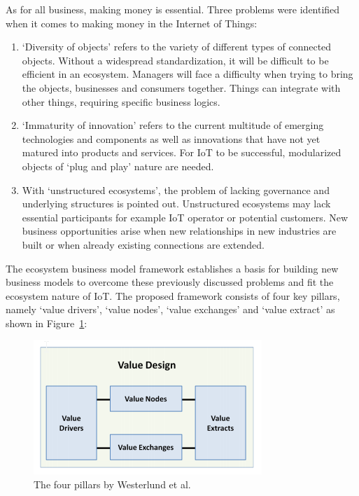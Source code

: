 		As for all business, making money is essential. Three problems were identified  when it comes to making money in the Internet of Things:

		\begin{enumerate}
			\item `Diversity of objects' refers to the variety of different types of connected objects. Without a widespread standardization, it will be difficult to be efficient in an ecosystem. Managers will face a difficulty when trying to bring the objects, businesses and consumers together. Things can integrate with other things, requiring specific business logics.

			\item `Immaturity of innovation' refers to the current multitude of emerging technologies and components as well as innovations that have not yet matured into products and services. For IoT to be successful, modularized objects of `plug and play' nature are needed.

			\item With `unstructured ecosystems', the problem of lacking governance and underlying structures is pointed out. Unstructured ecosystems may lack essential participants for example IoT operator or potential customers. New business opportunities arise when new relationships in new industries are built or when already existing connections are extended.
		\end{enumerate}

		The ecosystem business model framework establishes a basis for building new business models to overcome these previously discussed problems and fit the ecosystem nature of IoT. The proposed framework consists of four key pillars, namely `value drivers', `value nodes', `value exchanges' and `value extract' as shown in Figure~\ref{Westerlund pillars}:

			\begin{figure}[ht]
			    \begin{center}
			    \includegraphics[scale=1.0]{Talk11/westerlundpillars.png}
			    \end{center}
			    \caption{The four pillars by Westerlund et al. \cite[p.11]{westerlund}}
			    \label{Westerlund pillars}
			\end{figure}

